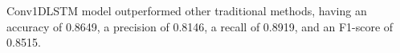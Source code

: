 Conv1DLSTM model outperformed other traditional methods, having an accuracy of 0.8649, a precision of 0.8146, a recall of 0.8919, and an F1-score of 0.8515.